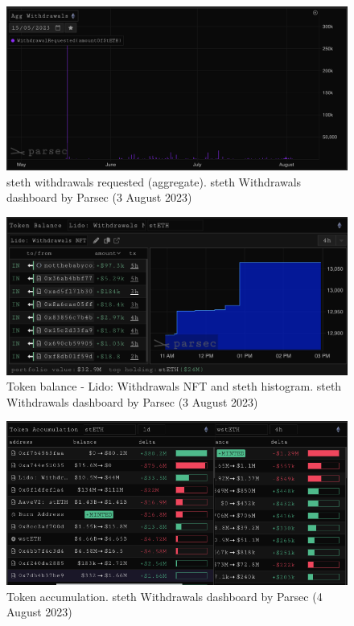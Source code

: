 \documentclass[UTF8]{article}
\begin{document}
\begin{figure}[htbp]
\begin{center}
\includegraphics[width=\linewidth]{images/parsec4}
\caption{\gls{steth} withdrawals requested (aggregate). \gls{steth} Withdrawals dashboard by Parsec (3 August 2023)}
\label{fig:parsec4}
\end{center}
\end{figure}

\begin{figure}[htbp]
\begin{center}
\includegraphics[width=\linewidth]{images/parsec5}
\caption{Token balance - Lido: Withdrawals NFT and \gls{steth} histogram. \gls{steth} Withdrawals dashboard by Parsec (3 August 2023)}
\label{fig:parsec5}
\end{center}
\end{figure}

\begin{figure}[htbp]
\begin{center}
\includegraphics[width=\linewidth]{images/parsec6}
\caption{Token accumulation. \gls{steth} Withdrawals dashboard by Parsec (4 August 2023)}
\label{fig:parsec6}
\end{center}
\end{figure}
\end{document}
